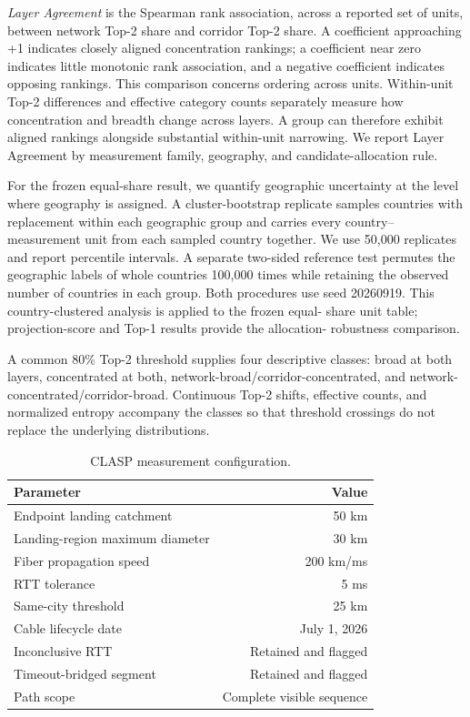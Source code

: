 \emph{Layer Agreement} is the Spearman rank association, across a reported
set of units, between network Top-2 share and corridor Top-2 share. A
coefficient approaching +1 indicates closely aligned concentration rankings;
a coefficient near zero indicates little monotonic rank association, and a
negative coefficient indicates opposing rankings. This comparison concerns
ordering across units. Within-unit Top-2 differences and effective category
counts separately measure how concentration and breadth change across
layers. A group can therefore exhibit aligned rankings alongside substantial
within-unit narrowing. We report Layer Agreement by measurement family,
geography, and candidate-allocation rule.

For the frozen equal-share result, we quantify geographic uncertainty at the
level where geography is assigned. A cluster-bootstrap replicate samples
countries with replacement within each geographic group and carries every
country--measurement unit from each sampled country together. We use 50,000
replicates and report percentile intervals. A separate two-sided reference
test permutes the geographic labels of whole countries 100,000 times while
retaining the observed number of countries in each group. Both procedures use
seed 20260919. This country-clustered analysis is applied to the frozen equal-
share unit table; projection-score and Top-1 results provide the allocation-
robustness comparison.

A common 80\% Top-2 threshold supplies four descriptive classes: broad at both
layers, concentrated at both, network-broad/corridor-concentrated, and
network-concentrated/corridor-broad. Continuous Top-2 shifts, effective counts,
and normalized entropy accompany the classes so that threshold crossings do
not replace the underlying distributions.

\begin{table}[t]
  \centering
  \caption{CLASP measurement configuration.}
  \label{tab:measurement-configuration}
  \footnotesize
  \setlength{\tabcolsep}{3.5pt}
  \begin{tabular}{lr}
    \toprule
    Parameter & Value \\
    \midrule
    Endpoint landing catchment & 50 km \\
    Landing-region maximum diameter & 30 km \\
    Fiber propagation speed & 200 km/ms \\
    RTT tolerance & 5 ms \\
    Same-city threshold & 25 km \\
    Cable lifecycle date & July 1, 2026 \\
    Inconclusive RTT & Retained and flagged \\
    Timeout-bridged segment & Retained and flagged \\
    Path scope & Complete visible sequence \\
    \bottomrule
  \end{tabular}
\end{table}
